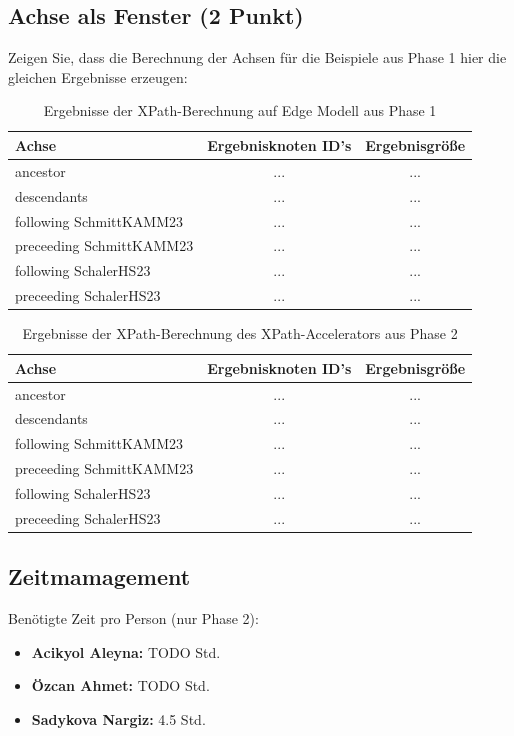 \documentclass[11pt]{scrartcl}
\begin{document}
\subsection*{Achse als Fenster (2 Punkt)}
Zeigen Sie, dass die Berechnung der Achsen für die Beispiele aus Phase 1 hier die gleichen Ergebnisse erzeugen:

\begin{table}[h]
	\centering
		\begin{center}
			\begin{tabular}{ l | c c }
				\toprule
				Achse & Ergebnisknoten ID's & Ergebnisgröße\\
				\midrule
				ancestor & ... & ... \\ 
				descendants & ... & ... \\  
				following SchmittKAMM23& ... & ... \\  
				preceeding SchmittKAMM23 & ... & ... \\ 
				following SchalerHS23& ... & ... \\  
				preceeding SchalerHS23& ... & ... \\ 
				\bottomrule
			\end{tabular}
			\end{center}
	\caption{Ergebnisse der XPath-Berechnung auf Edge Modell aus Phase 1}
	\label{tab:ErgebnisseDerXPathBerechnug}
\end{table}

\begin{table}[h]
	\centering
		\begin{center}
			\begin{tabular}{ l | c c }
				\toprule
				Achse & Ergebnisknoten ID's & Ergebnisgröße\\
				\midrule
				ancestor & ... & ... \\ 
				descendants & ... & ... \\  
				following SchmittKAMM23& ... & ... \\  
				preceeding SchmittKAMM23 & ... & ... \\ 
				following SchalerHS23& ... & ... \\  
				preceeding SchalerHS23& ... & ... \\ 
				\bottomrule
			\end{tabular}
			\end{center}
	\caption{Ergebnisse der XPath-Berechnung des XPath-Accelerators aus Phase 2}
	\label{tab:ErgebnisseDerXPathBerechnug}
\end{table}

\subsection*{Zeitmamagement}

Benötigte Zeit pro Person (nur Phase 2):
\begin{itemize}
  \item \textbf{Acikyol Aleyna:} TODO Std.
  \item \textbf{Özcan Ahmet:} TODO Std.
  \item \textbf{Sadykova Nargiz:} 4.5 Std.
\end{itemize}
\end{document}
